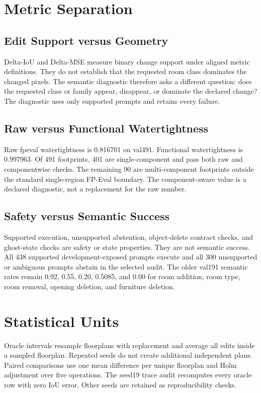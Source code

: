 \documentclass[10pt,twocolumn,letterpaper]{article}
\begin{document}
\section{Metric Separation}
\subsection{Edit Support versus Geometry}
Delta-IoU and Delta-MSE measure binary change support under aligned metric
definitions. They do not establish that the requested room class dominates the
changed pixels. The semantic diagnostic therefore asks a different question: does
the requested class or family appear, disappear, or dominate the declared change?
The diagnostic uses only supported prompts and retains every failure.

\subsection{Raw versus Functional Watertightness}
Raw fpeval watertightness is 0.816701 on val491. Functional watertightness is
0.997963. Of 491 footprints, 401 are single-component and pass both raw and
componentwise checks. The remaining 90 are multi-component footprints outside the
standard single-region FP-Eval boundary. The component-aware value is a declared
diagnostic, not a replacement for the raw number.

\subsection{Safety versus Semantic Success}
Supported execution, unsupported abstention, object-delete contract checks, and
ghost-state checks are safety or state properties. They are not semantic success.
All 438 supported development-exposed prompts execute and all 300 unsupported or
ambiguous prompts abstain in the selected audit. The older val191 semantic rates
remain 0.92, 0.55, 0.20, 0.5085, and 0.00 for room addition, room type, room
removal, opening deletion, and furniture deletion.

\section{Statistical Units}
Oracle intervals resample floorplans with replacement and average all edits inside
a sampled floorplan. Repeated seeds do not create additional independent plans.
Paired comparisons use one mean difference per unique floorplan and Holm
adjustment over five operations. The seed19 trace audit recomputes every oracle
row with zero IoU error. Other seeds are retained as reproducibility checks.
\end{document}

